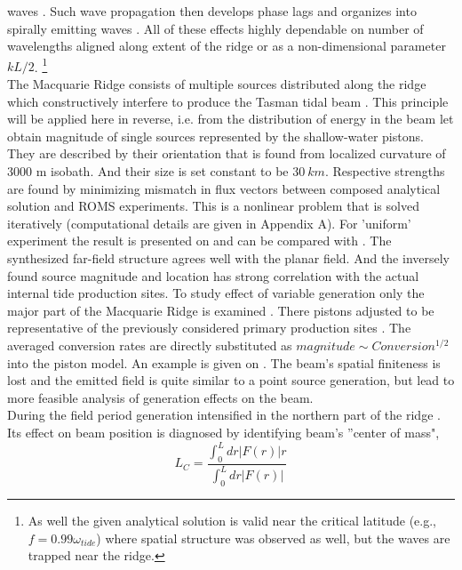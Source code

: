 \documentclass[12pt]{article}
\begin{document}
waves . Such wave propagation then develops phase lags and organizes into  
spirally emitting waves \citep{baines2007internal}. All of these effects highly dependable on 
number of wavelengths aligned along extent of the ridge or as a non-dimensional parameter $k L/2$. 
\footnote{As well the given analytical solution is valid near the critical latitude (e.g., $f = 
0.99 
\omega_{tide}$) where spatial structure was observed as well, but the waves are trapped near the 
ridge.}\\
The Macquarie Ridge consists of multiple sources distributed along the ridge which constructively 
interfere to produce the Tasman tidal beam \citep{rainville2010interference, 
klymak2016reflection}. This principle will be applied here in reverse, i.e. from the distribution 
of energy in the beam let obtain magnitude of single sources represented by the shallow-water 
pistons. They are described by their orientation that is found from localized curvature of $3000$ m 
isobath. And their size is set constant to be $30~km$. Respective strengths are found by minimizing 
mismatch in flux vectors between composed analytical solution and ROMS experiments. This is a 
nonlinear problem that is solved iteratively (computational details are given in Appendix A). 
For 'uniform' experiment the result is presented on  and can be compared 
with . The synthesized far-field structure agrees well with the planar field. 
And the inversely found source magnitude and location has strong correlation with the actual 
internal tide production sites. To study effect of variable generation only the major part of the 
Macquarie Ridge is examined . There pistons adjusted to be representative of 
the previously considered primary production sites . The averaged conversion 
rates are directly substituted as $magnitude \sim Conversion^{1/2}$ into the piston model. An 
example is given on . The beam's spatial finiteness is lost and the 
emitted field is quite similar to a point source generation, but lead to more feasible analysis of 
generation effects on the beam.\\
During the field period generation intensified in the northern part of the ridge 
. Its effect on beam position is diagnosed by identifying beam's 
''center of mass",
\begin{equation}
L_{C} = \frac{\int_0^{L} dr |F(r)|r}{\int_0^{L} dr |F(r)|}
\end{equation}
\end{document}
